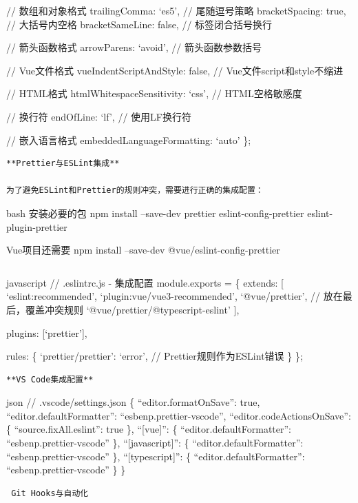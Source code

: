 {{// 数组和对象格式 trailingComma: `es5', // 尾随逗号策略 bracketSpacing: true, // 大括号内空格 bracketSameLine: false, // 标签闭合括号换行

// 箭头函数格式 arrowParens: `avoid', // 箭头函数参数括号

// Vue文件格式 vueIndentScriptAndStyle: false, // Vue文件script和style不缩进

// HTML格式 htmlWhitespaceSensitivity: `css', // HTML空格敏感度

// 换行符 endOfLine: `lf', // 使用LF换行符

// 嵌入语言格式 embeddedLanguageFormatting: `auto' \};

\begin{lstlisting}
**Prettier与ESLint集成**

为了避免ESLint和Prettier的规则冲突，需要进行正确的集成配置：
\end{lstlisting}

bash  安装必要的包 npm install --save-dev prettier eslint-config-prettier eslint-plugin-prettier

 Vue项目还需要 npm install --save-dev @vue/eslint-config-prettier

\begin{lstlisting}

\end{lstlisting}

javascript // .eslintrc.js - 集成配置 module.exports = \{ extends: {[} `eslint:recommended', `plugin:vue/vue3-recommended', `@vue/prettier', // 放在最后，覆盖冲突规则 `@vue/prettier/@typescript-eslint' {]},

plugins: {[}`prettier'{]},

rules: \{ `prettier/prettier': `error', // Prettier规则作为ESLint错误 \} \};

\begin{lstlisting}
**VS Code集成配置**
\end{lstlisting}

json // .vscode/settings.json \{ ``editor.formatOnSave'': true, ``editor.defaultFormatter'': ``esbenp.prettier-vscode'', ``editor.codeActionsOnSave'': \{ ``source.fixAll.eslint'': true \}, ``{[}vue{]}'': \{ ``editor.defaultFormatter'': ``esbenp.prettier-vscode'' \}, ``{[}javascript{]}'': \{ ``editor.defaultFormatter'': ``esbenp.prettier-vscode'' \}, ``{[}typescript{]}'': \{ ``editor.defaultFormatter'': ``esbenp.prettier-vscode'' \} \}

\begin{lstlisting}
 Git Hooks与自动化


\end{lstlisting}}}
